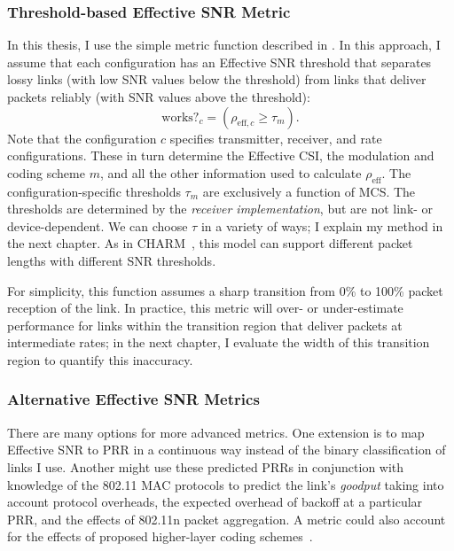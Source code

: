 \subsubsection{Threshold-based Effective SNR Metric}
In this thesis, I use the simple  metric function described in . In this approach, I assume that each configuration has an Effective SNR threshold that separates lossy links (with low SNR values below the threshold) from links that deliver packets reliably (with SNR values above the threshold):
\begin{equation}
\label{eq:threshold}
\text{works?}_c = (\rho_{\text{eff},c} \geq \tau_m).
\end{equation}
Note that the configuration $c$ specifies transmitter, receiver, and rate configurations. These in turn determine the Effective CSI, the modulation and coding scheme $m$, and all the other information used to calculate $\rho_\text{eff}$. The configuration-specific thresholds $\tau_m$ are exclusively a function of MCS. The thresholds are determined by the \emph{receiver implementation}, but are not link- or device-dependent. We can choose $\tau$ in a variety of ways; I explain my method in the next chapter. As in CHARM~\cite{Judd_CHARM}, this model can support different packet lengths with different SNR thresholds.

For simplicity, this function assumes a sharp transition from 0\% to 100\% packet reception of the link. In practice, this metric will over- or under-estimate performance for links within the transition region that deliver packets at intermediate rates; in the next chapter, I evaluate the width of this transition region to quantify this inaccuracy.

\subsubsection{Alternative Effective SNR Metrics}
\label{sec:metric_functions}
There are many options for more advanced metrics. One extension is to map Effective SNR to PRR in a continuous way instead of the binary classification of links I use. Another might use these predicted PRRs in conjunction with knowledge of the 802.11 MAC protocols to predict the link's \emph{goodput} taking into account protocol overheads, the expected overhead of backoff at a particular PRR, and the effects of 802.11n packet aggregation. A metric could also account for the effects of proposed higher-layer coding schemes~\cite{Gudipati_Strider,Perry_Spinal,Lin_ZipTX}.

